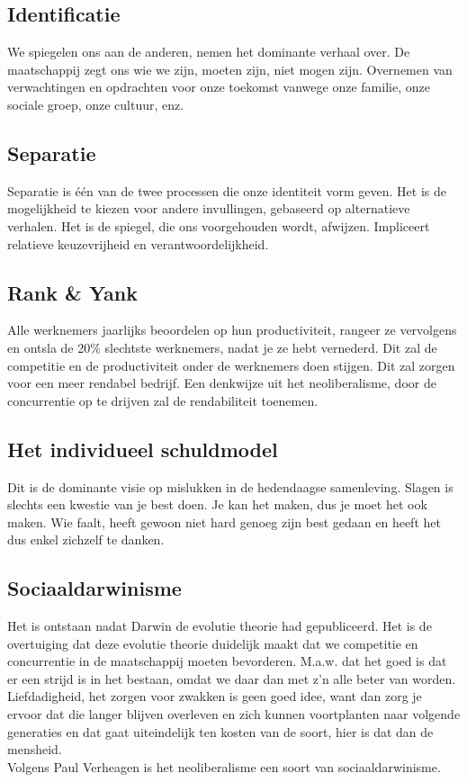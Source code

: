\documentclass[11pt,a4paper,titlepage]{article}
\begin{document}
\subsection{Identificatie}
We spiegelen ons aan de anderen, nemen het dominante verhaal over. De maatschappij zegt ons wie we zijn, moeten zijn, niet mogen zijn. Overnemen van verwachtingen en opdrachten voor onze toekomst vanwege onze familie, onze sociale groep, onze cultuur, enz.

\subsection{Separatie}
Separatie is één van de twee processen die onze identiteit vorm geven. Het is de mogelijkheid te kiezen voor andere invullingen, gebaseerd op alternatieve verhalen. Het is de spiegel, die ons voorgehouden wordt, afwijzen. Impliceert relatieve keuzevrijheid en verantwoordelijkheid.

\subsection{Rank \& Yank}
Alle werknemers jaarlijks beoordelen op hun productiviteit, rangeer ze vervolgens en ontsla de 20\% slechtste werknemers, nadat je ze hebt vernederd. Dit zal de competitie en de productiviteit onder de werknemers doen stijgen. Dit zal zorgen voor een meer rendabel bedrijf. Een denkwijze uit het neoliberalisme, door de concurrentie op te drijven zal de rendabiliteit toenemen.

\subsection{Het individueel schuldmodel}
Dit is de dominante visie op mislukken in de hedendaagse samenleving. Slagen is slechts een kwestie van je best doen. Je kan het maken, dus je moet het ook maken. Wie faalt, heeft gewoon niet hard genoeg zijn best gedaan en heeft het dus enkel zichzelf te danken.

\subsection{Sociaaldarwinisme}

Het is ontstaan nadat Darwin de evolutie theorie had gepubliceerd. Het is de overtuiging dat deze evolutie theorie duidelijk maakt dat we competitie en concurrentie in de maatschappij moeten bevorderen. M.a.w. dat het goed is dat er een strijd is in het bestaan, omdat we daar dan met z'n alle beter van worden. Liefdadigheid, het zorgen voor zwakken is geen goed idee, want dan zorg je ervoor dat die langer blijven overleven en zich kunnen voortplanten naar volgende generaties en dat gaat uiteindelijk ten kosten van de soort, hier is dat dan de mensheid. \\ Volgens Paul Verheagen is het neoliberalisme een soort van sociaaldarwinisme.
\end{document}
